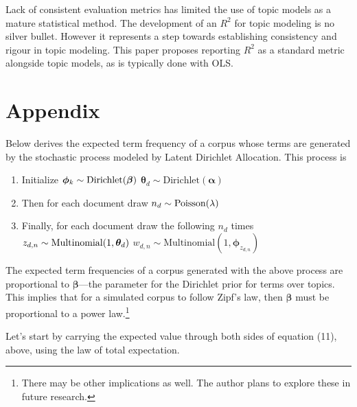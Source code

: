 \documentclass[conference,final,]{IEEEtran}
\providecommand{\tightlist}{%
  \setlength{\itemsep}{0pt}\setlength{\parskip}{0pt}}
\begin{document}
Lack of consistent evaluation metrics has limited the use of topic
models as a mature statistical method. The development of an \(R^2\) for
topic modeling is no silver bullet. However it represents a step towards
establishing consistency and rigour in topic modeling. This paper
proposes reporting \(R^2\) as a standard metric alongside topic models,
as is typically done with OLS.

\newpage

\hypertarget{appendix}{%
\section{Appendix}\label{appendix}}

Below derives the expected term frequency of a corpus whose terms are
generated by the stochastic process modeled by Latent Dirichlet
Allocation. This process is

\begin{enumerate}
\def\labelenumi{\arabic{enumi}.}
\tightlist
\item
  Initialize
  \(\\ \boldsymbol\phi_k \sim \text{Dirichlet}(\boldsymbol\beta)\\\)
  \(\boldsymbol\theta_d \sim \text{Dirichlet}(\boldsymbol\alpha)\)
\item
  Then for each document draw \(\\ n_d \sim \text{Poisson}(\lambda)\)
\item
  Finally, for each document draw the following \(n_d\) times
  \(\\ z_{d,n} \sim \text{Multinomial}(1, \boldsymbol\theta_d)\\\)
  \(w_{d,n} \sim \text{Multinomial}(1, \boldsymbol\phi_{z_{d,n}})\)
\end{enumerate}

The expected term frequencies of a corpus generated with the above
process are proportional to \(\boldsymbol\beta\)---the parameter for the
Dirichlet prior for terms over topics. This implies that for a simulated
corpus to follow Zipf's law, then \(\boldsymbol\beta\) must be
proportional to a power law.\footnote{There may be other implications as
  well. The author plans to explore these in future research.}

Let's start by carrying the expected value through both sides of
equation (11), above, using the law of total expectation.
\end{document}
